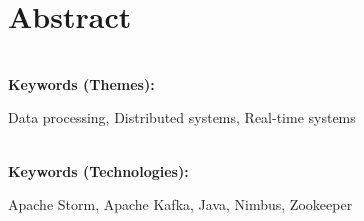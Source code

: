 \titleformat{\chapter}[display]
{\normalfont\bfseries}{}{0pt}{\Huge}

\chapter*{Abstract}


\textbf{\\Keywords (Themes):} 

Data processing, Distributed systems, Real-time systems

\textbf{\\Keywords (Technologies):} 

Apache Storm, Apache Kafka, Java, Nimbus, Zookeeper

